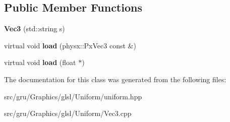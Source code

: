 \subsection*{\-Public \-Member \-Functions}
\begin{DoxyCompactItemize}
\item 
\hypertarget{classglutpp_1_1glsl_1_1Uniform_1_1Scalar_1_1Vec3_a666baf1e0cc2e51e0ff248d603492885}{{\bfseries \-Vec3} (std\-::string s)}\label{classglutpp_1_1glsl_1_1Uniform_1_1Scalar_1_1Vec3_a666baf1e0cc2e51e0ff248d603492885}

\item 
\hypertarget{classglutpp_1_1glsl_1_1Uniform_1_1Scalar_1_1Vec3_a3459fef29f2382c0b3312f5a011c20a4}{virtual void {\bfseries load} (physx\-::\-Px\-Vec3 const \&)}\label{classglutpp_1_1glsl_1_1Uniform_1_1Scalar_1_1Vec3_a3459fef29f2382c0b3312f5a011c20a4}

\item 
\hypertarget{classglutpp_1_1glsl_1_1Uniform_1_1Scalar_1_1Vec3_a2a9caca2202fe49d6b0282a07218d2cf}{virtual void {\bfseries load} (float $\ast$)}\label{classglutpp_1_1glsl_1_1Uniform_1_1Scalar_1_1Vec3_a2a9caca2202fe49d6b0282a07218d2cf}

\end{DoxyCompactItemize}


\-The documentation for this class was generated from the following files\-:\begin{DoxyCompactItemize}
\item 
src/gru/\-Graphics/glsl/\-Uniform/uniform.\-hpp\item 
src/gru/\-Graphics/glsl/\-Uniform/\-Vec3.\-cpp\end{DoxyCompactItemize}
